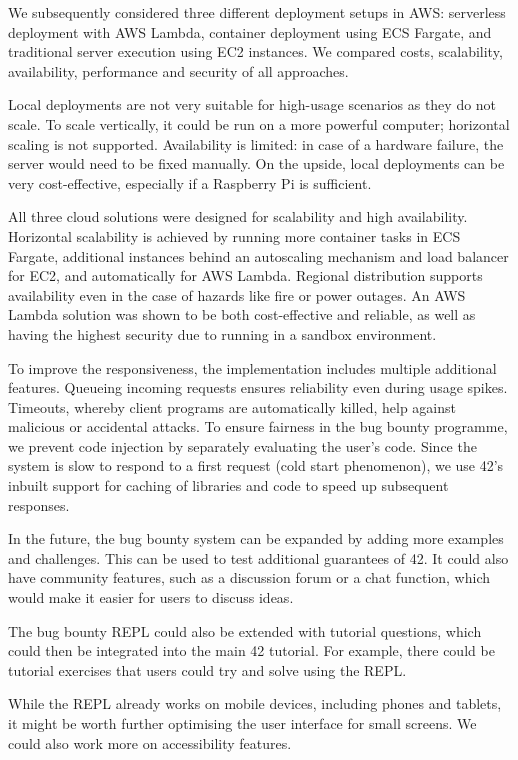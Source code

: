 We subsequently considered three different deployment setups in AWS: serverless deployment with AWS Lambda, container deployment using ECS Fargate, and traditional server execution using EC2 instances. We compared costs, scalability, availability, performance and security of all approaches.

Local deployments are not very suitable for high-usage scenarios as they do not scale. To scale vertically, it could be run on a more powerful computer; horizontal scaling is not supported. Availability is limited: in case of a hardware failure, the server would need to be fixed manually. On the upside, local deployments can be very cost-effective, especially if a Raspberry Pi is sufficient.

All three cloud solutions were designed for scalability and high availability. Horizontal scalability is achieved by running more container tasks in ECS Fargate, additional instances behind an autoscaling mechanism and load balancer for EC2, and automatically for AWS Lambda. Regional distribution supports availability even in the case of hazards like fire or power outages. An AWS Lambda solution was shown to be both cost-effective and reliable, as well as having the highest security due to running in a sandbox environment.

To improve the responsiveness, the implementation includes multiple additional features. Queueing incoming requests ensures reliability even during usage spikes. Timeouts, whereby client programs are automatically killed, help against malicious or accidental attacks. To ensure fairness in the bug bounty programme, we prevent code injection by separately evaluating the user's code. Since the system is slow to respond to a first request (cold start phenomenon), we use 42's inbuilt support for caching of libraries and code to speed up subsequent responses.

In the future, the bug bounty system can be expanded by adding more examples and challenges. This can be used to test additional guarantees of 42. It could also have community features, such as a discussion forum or a chat function, which would make it easier for users to discuss ideas.

The bug bounty REPL could also be extended with tutorial questions, which could then be integrated into the main 42 tutorial. For example, there could be tutorial exercises that users could try and solve using the REPL.

While the REPL already works on mobile devices, including phones and tablets, it might be worth further optimising the user interface for small screens. We could also work more on accessibility features.

